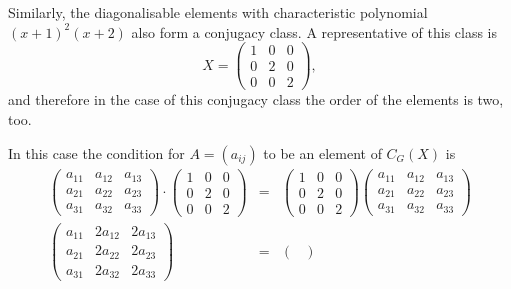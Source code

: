 \documentclass[11pt]{article} \usepackage{amssymb}
\begin{document}
\begin{enumerate}
\begin{enumerate}
\begin{itemize}
        Similarly, the diagonalisable elements with characteristic polynomial 
        $(x+1)^2(x+2)$ also form a conjugacy class. A representative of this 
        class is
        \begin{equation*}
          X=
          \begin{pmatrix}
            1&0  &0 \\ 
            0&2  &0 \\ 
            0&0  &2 
          \end{pmatrix},
        \end{equation*}
        and therefore in the case of this conjugacy class the order of the 
        elements is two, too.
        
        In this case the condition for $A=(a_{ij})$ to be an element of $C_G(X)$
        is
        \begin{eqnarray*}
          \begin{pmatrix}
            a_{11}&a_{12}  &a_{13} \\ 
            a_{21}&a_{22}  &a_{23} \\ 
            a_{31}&a_{32}  &a_{33} 
          \end{pmatrix}
          \cdot
          \begin{pmatrix}
            1&0  &0 \\ 
            0&2  &0 \\ 
            0&0  &2 
          \end{pmatrix}
          &=&
          \begin{pmatrix}
            1&0  &0 \\ 
            0&2  &0 \\ 
            0&0  &2 
          \end{pmatrix}
          \begin{pmatrix}
            a_{11}&a_{12}  &a_{13} \\ 
            a_{21}&a_{22}  &a_{23} \\ 
            a_{31}&a_{32}  &a_{33} 
          \end{pmatrix}
          \\
          \begin{pmatrix}
            a_{11}&2a_{12}  &2a_{13} \\ 
            a_{21}&2a_{22}  &2a_{23} \\ 
            a_{31}&2a_{32}  &2a_{33} 
          \end{pmatrix}
          &=&
          \begin{pmatrix}

\end{pmatrix}
\end{eqnarray*}
\end{itemize}
\end{enumerate}
\end{enumerate}
\end{document}
